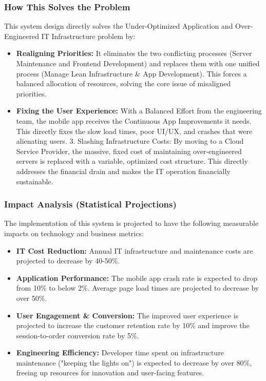 \documentclass[12pt,a4paper]{article}
\begin{document}
\subsubsection{How This Solves the Problem}
This system design directly solves the Under-Optimized Application and Over-Engineered IT Infrastructure problem by:
\begin{itemize}[leftmargin=*]
  \item \textbf{Realigning Priorities:} It eliminates the two conflicting processes (Server Maintenance and Frontend Development) and replaces them with one unified process (Manage Lean Infrastructure \& App Development). This forces a balanced allocation of resources, solving the core issue of misaligned priorities.
  \item \textbf{Fixing the User Experience:} With a Balanced Effort from the engineering team, the mobile app receives the Continuous App Improvements it needs. This directly fixes the slow load times, poor UI/UX, and crashes that were alienating users. 3. Slashing Infrastructure Costs: By moving to a Cloud Service Provider, the massive, fixed cost of maintaining over-engineered servers is replaced with a variable, optimized cost structure. This directly addresses the financial drain and makes the IT operation financially sustainable.
\end{itemize}

\subsubsection{Impact Analysis (Statistical Projections)}
The implementation of this system is projected to have the following measurable impacts on technology and business metrics:

\begin{itemize}
    \item \textbf{IT Cost Reduction:} Annual IT infrastructure and maintenance costs are projected to decrease by 40-50\%.
    \item \textbf{Application Performance:} The mobile app crash rate is expected to drop from 10\% to below 2\%. Average page load times are projected to decrease by over 50\%.
    \item \textbf{User Engagement \& Conversion:} The improved user experience is projected to increase the customer retention rate by 10\% and improve the session-to-order conversion rate by 5\%.
    \item \textbf{Engineering Efficiency:} Developer time spent on infrastructure maintenance ("keeping the lights on") is expected to decrease by over 80\%, freeing up resources for innovation and user-facing features.
\end{itemize}
\end{document}
